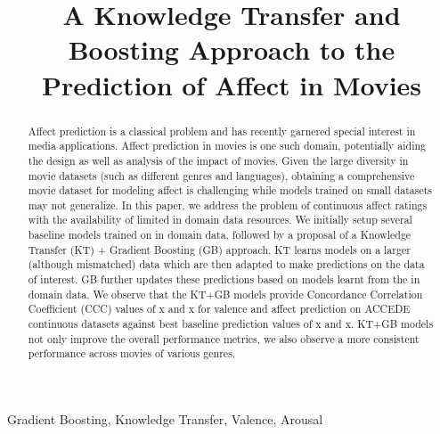 \documentclass{article}
\title{A Knowledge Transfer and Boosting Approach to the Prediction of Affect in Movies}
\begin{document}
\ninept
%
\maketitle
%
\begin{abstract}
Affect prediction is a classical problem and has recently garnered special interest in media applications. 
Affect prediction in movies is one such domain, potentially aiding the design as well as analysis of the impact of movies.
Given the large diversity in movie datasets (such as different genres and languages), obtaining a comprehensive movie dataset for modeling affect is challenging while models trained on small datasets may not generalize. 
In this paper, we address the problem of continuous affect ratings with the availability of limited in domain data resources. 
We initially setup several baseline models trained on in domain data, followed by a proposal of a Knowledge Transfer (KT) + Gradient Boosting (GB) approach.
KT learns models on a larger (although mismatched) data which are then adapted to make predictions on the data of interest. 
GB further updates these predictions based on models learnt from the in domain data.
We observe that the KT+GB models provide Concordance Correlation Coefficient (CCC) values of x and x for valence and affect prediction on ACCEDE continuous datasets against best baseline prediction values of x and x. 
KT+GB models not only improve the overall performance metrics, we also observe a more consistent performance across movies of various genres. 
 
\end{abstract}
%
\begin{keywords}
Gradient Boosting, Knowledge Transfer, Valence, Arousal
\end{keywords}
%
\end{document}

